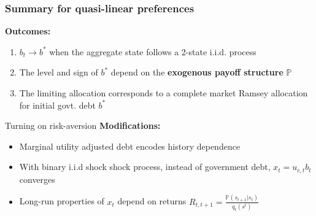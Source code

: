 \documentclass{beamer}
\begin{document}
\begin{frame}
 \frametitle{Summary for quasi-linear preferences}
 \textbf{Outcomes:}
 \begin{enumerate}
  \item  $b_t\to b^*$ when the aggregate state follows a 2-state i.i.d. process
  \item The level  and sign of $b^*$ depend on the \textbf{exogenous payoff structure} $\mathbb{P}$
  \item The limiting allocation corresponds to a complete market Ramsey allocation for initial govt. debt $b^*$
 \end{enumerate}
 
 \end{frame}
 
 
 
 \begin{frame}{Turning on risk-aversion}
  \textbf{Modifications:}
  \begin{itemize}
   \item Marginal utility adjusted debt  encodes history dependence
   \item  With binary i.i.d shock shock process, instead of government debt,  $x_t=u_{c,t}b_{t}$  converges

   \item Long-run properties of $x_t$ depend on returns $R_{t,t+1}=\frac{\mathbb{P}(s_{t+1}|s_t)}{q_t(s^t)}$

  \end{itemize}
  \end{frame}
%
\end{document}
